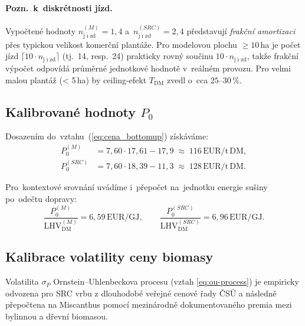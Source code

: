 \paragraph{Pozn.~k~diskrétnosti jízd.}
Vypočtené hodnoty $n_\mathrm{j\acute{\imath}zd}^{(M)} = 1{,}4$
a~$n_\mathrm{j\acute{\imath}zd}^{(SRC)} = 2{,}4$ představují
\emph{frakční amortizaci} přes typickou velikost komerční plantáže.
Pro modelovou plochu $\geq 10\,$ha je počet jízd $\lceil 10 \cdot
n_\mathrm{j\acute{\imath}zd} \rceil$ (tj.~14, resp.~24) prakticky rovný
součinu $10 \cdot n_\mathrm{j\acute{\imath}zd}$, takže frakční výpočet
odpovídá průměrné jednotkové hodnotě v~reálném provozu. Pro velmi
malou plantáž (< 5\,ha) by ceiling-efekt $T_\mathrm{DM}$ zvedl
o~cca $25$--$30\,\%$.

\subsection{Kalibrované hodnoty $P_0$}
\label{sec:cena_kalibrace}

Dosazením do~vztahu~(\ref{eq:cena_bottomup}) získáváme:
\begin{align}
P_0^{(M)}   &= 7{,}60 \cdot 17{,}61 - 17{,}9  \;\approx\; 116\,\mathrm{EUR/t\,DM}, \\
P_0^{(SRC)} &= 7{,}60 \cdot 18{,}39 - 11{,}3  \;\approx\; 128\,\mathrm{EUR/t\,DM}.
\end{align}

Pro~kontextové srovnání uvádíme i~přepočet na~jednotku energie sušiny
po~odečtu dopravy:
\begin{equation}
\frac{P_0^{(M)}}{\mathrm{LHV}_\mathrm{DM}^{(M)}} = 6{,}59\,\mathrm{EUR/GJ}, \qquad
\frac{P_0^{(SRC)}}{\mathrm{LHV}_\mathrm{DM}^{(SRC)}} = 6{,}96\,\mathrm{EUR/GJ}.
\end{equation}

\subsection{Kalibrace volatility ceny biomasy}
\label{sec:sigma_P}

Volatilita $\sigma_P$ Ornstein--Uhlenbeckova procesu (vztah \ref{eq:ou-process}) je 
empiricky odvozena pro SRC vrbu z dlouhodobé veřejné cenové řady ČSÚ a 
následně přepočtena na Miscanthus pomocí mezinárodně dokumentovaného 
premia mezi bylinnou a dřevní biomasou.

